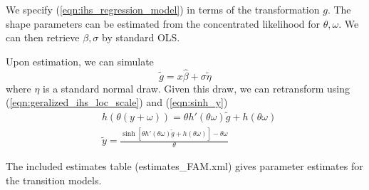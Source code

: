 We specify (\ref{eqn:ihs_regression_model}) in terms of the transformation $g$. The shape parameters 
can be estimated from the concentrated likelihood for $\theta, \omega$. We can then 
retrieve $\beta, \sigma$ by standard OLS. 

Upon estimation, we can simulate 
\[
\tilde{g} = x \hat{\beta} + \sigma \tilde{\eta}
\]
where $\eta$ is a standard normal draw. Given this draw, we can retransform using 
(\ref{eqn:geralized_ihs_loc_scale}) and (\ref{eqn:sinh_y})
\begin{align*}
&h(\theta(y+\omega)) = \theta h'(\theta\omega)\tilde{g} + h(\theta\omega)\\
&\tilde{y} = \frac{\sinh\left[\theta h'(\theta\omega)\tilde{g} + h(\theta\omega)\right]-\theta\omega}{\theta}
\end{align*}

The included estimates table (estimates\_FAM.xml) gives parameter estimates for the transition models.

